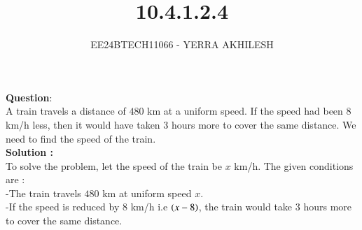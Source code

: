 \documentclass[journal]{IEEEtran}
\begin{document}

\vspace{3cm}

\title{10.4.1.2.4}
\author{EE24BTECH11066 - YERRA AKHILESH}
{\let\newpage\relax\maketitle}

\renewcommand{\thefigure}{\theenumi}
\renewcommand{\thetable}{\theenumi}
\setlength{\intextsep}{10pt} %

\renewcommand{\thetable}{\theenumi}
\textbf{Question}:\\

A train travels a distance of $480 $ km at a uniform speed. If the speed had been $8$ km/h less, then it would have taken 3 hours more to cover the same distance. We need to find the speed of the train.\\

\textbf{Solution : }\\

To solve the problem, let the speed of the train be $x$ km/h. The given conditions are :\\

-The train travels $480$ km at uniform speed $x$.\\
-If the speed is reduced by $8$ km/h i.e $\left(x-8\right)$, the train would take 3 hours more to cover the same distance.\\
\end{document}
